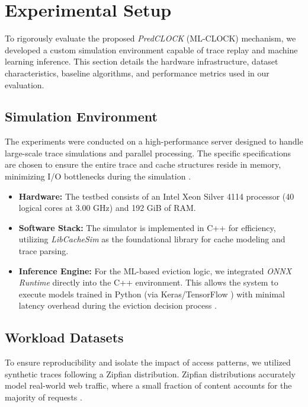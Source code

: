 \section{Experimental Setup}
\label{sec:experimental_setup}

To rigorously evaluate the proposed \textit{PredCLOCK} (ML-CLOCK)
mechanism, we developed a custom simulation environment capable of
trace replay and machine learning inference. This section details the
hardware infrastructure, dataset characteristics, baseline
algorithms, and performance metrics used in our evaluation.

\subsection{Simulation Environment}
The experiments were conducted on a high-performance server designed
to handle large-scale trace simulations and parallel processing. The
specific specifications are chosen to ensure the entire trace and
cache structures reside in memory, minimizing I/O bottlenecks during
the simulation \cite{Yang2021A}.

\begin{itemize}
  \item \textbf{Hardware:} The testbed consists of an Intel Xeon
    Silver 4114 processor (40 logical cores at 3.00 GHz) and 192 GiB of RAM.
  \item \textbf{Software Stack:} The simulator is implemented in C++
    for efficiency, utilizing \textit{LibCacheSim} \cite{Yang2021A}
    as the foundational library for cache modeling and trace parsing.
  \item \textbf{Inference Engine:} For the ML-based eviction logic,
    we integrated \textit{ONNX Runtime} \cite{Tian2020Compiling}
    directly into the C++ environment. This allows the system to
    execute models trained in Python (via Keras/TensorFlow
    \cite{chollet2015keras, tensorflow2015-whitepaper}) with minimal
    latency overhead during the eviction decision process
    \cite{Jajal2024Interoperability}.
\end{itemize}

\subsection{Workload Datasets}
To ensure reproducibility and isolate the impact of access patterns,
we utilized synthetic traces following a Zipfian distribution.
Zipfian distributions accurately model real-world web traffic, where
a small fraction of content accounts for the majority of requests
\cite{Breslau1999Web}.

